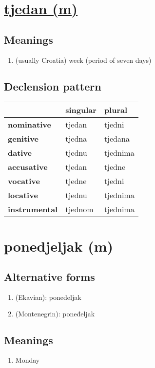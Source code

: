 \filbreak
\section{\underline{tjedan (m)}}
\subsection*{Meanings}
\begin{enumerate}
\item (usually Croatia) week (period of seven days)
\end{enumerate}
\subsection*{Declension pattern}
\begin{tabularx}{\linewidth}{Xll}
\toprule
{} & singular &    plural \\
\midrule
\textbf{nominative  } &   tjedan &    tjedni \\
\textbf{genitive    } &   tjedna &   tjedana \\
\textbf{dative      } &   tjednu &  tjednima \\
\textbf{accusative  } &   tjedan &    tjedne \\
\textbf{vocative    } &   tjedne &    tjedni \\
\textbf{locative    } &   tjednu &  tjednima \\
\textbf{instrumental} &  tjednom &  tjednima \\
\bottomrule
\end{tabularx}

\filbreak
\section{ponedjeljak (m)}
\subsection*{Alternative forms}
\begin{enumerate}
\item (Ekavian): ponedeljak
\item (Montenegrin): poneđeljak
\end{enumerate}
\subsection*{Meanings}
\begin{enumerate}
\item Monday
\end{enumerate}
